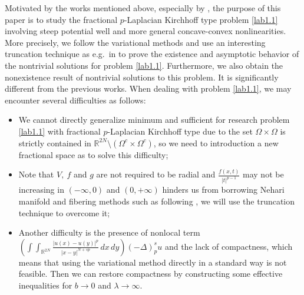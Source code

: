 \documentclass[10pt,a4paper]{amsart}
\numberwithin{equation}{section}
\begin{document}
Motivated by the works mentioned above, especially by  \cite{r16, r19, r21, r33}, 
the purpose of this paper is to study the fractional $p$-Laplacian Kirchhoff type 
problem \eqref{lab1.1} involving steep potential well and more general concave-convex 
nonlinearities. More precisely, we follow the variational methods and use an 
interesting truncation technique as e.g.\ in  \cite{r16} to prove the existence 
and asymptotic behavior of the nontrivial solutions for problem \eqref{lab1.1}. 
Furthermore, we also obtain the nonexistence result of nontrivial solutions to this
problem. It is significantly different from the previous works. When dealing with 
problem \eqref{lab1.1}, we may encounter several difficulties as follows:
\begin{itemize}
\item[(1)] We cannot directly generalize minimum and sufficient for research problem 
\eqref{lab1.1} with
fractional $p$-Laplacian Kirchhoff type due to the set $\Omega\times\Omega$ is strictly 
contained in $\mathbb{R}^{2N}\setminus(\Omega^c\times\Omega^c)$, so we need to 
introduction a new fractional space as \cite{r9, r22, r31} to solve this difficulty;

\item[(2)] Note that $V, ~f$ and $g$ are not required to be radial and 
$\frac{f(x,t)}{|t|^{p-1}}$ may not be increasing in $(-\infty, 0)$
and $(0, +\infty)$ hinders us from borrowing Nehari manifold and fibering methods
such as following \cite{r9, r24, r27}, we will use the truncation technique to
 overcome it;

\item[(3)] Another difficulty is the presence of nonlocal term
$(\int\int_{\mathbb{R}^{2N}}\frac{|u(x)-u(y)|^p}{|x-y|^{N+sp}}\,dx\,dy)(-\Delta)_p^s u$
and the lack of compactness, which means that using the variational method directly 
in a standard way is not feasible. Then we can restore compactness by constructing 
some effective inequalities for $b\to 0$ and $\lambda\to \infty$.
\end{itemize}
\end{document}
